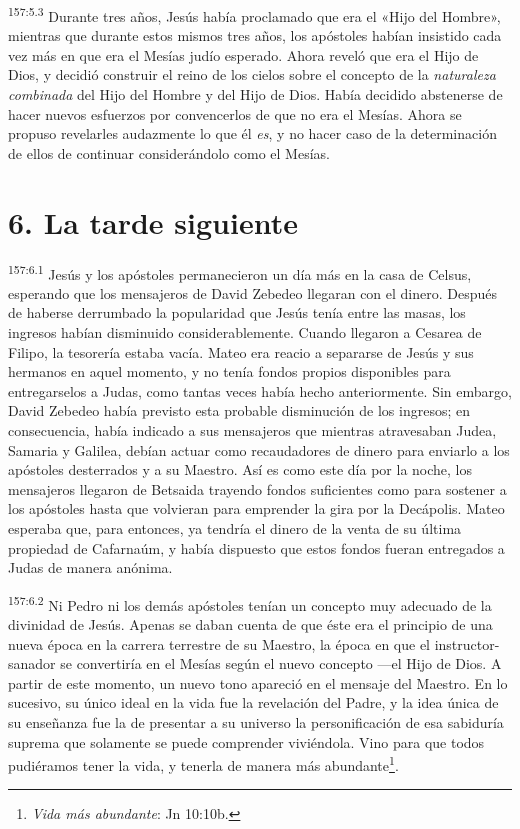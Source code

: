 \par 
\textsuperscript{157:5.3} Durante tres años, Jesús había proclamado que era el «Hijo del Hombre», mientras que durante estos mismos tres años, los apóstoles habían insistido cada vez más en que era el Mesías judío esperado. Ahora reveló que era el Hijo de Dios, y decidió construir el reino de los cielos sobre el concepto de la \textit{naturaleza combinada} del Hijo del Hombre y del Hijo de Dios. Había decidido abstenerse de hacer nuevos esfuerzos por convencerlos de que no era el Mesías. Ahora se propuso revelarles audazmente lo que él \textit{es}, y no hacer caso de la determinación de ellos de continuar considerándolo como el Mesías.

\section*{6. La tarde siguiente}
\par 
\textsuperscript{157:6.1} Jesús y los apóstoles permanecieron un día más en la casa de Celsus, esperando que los mensajeros de David Zebedeo llegaran con el dinero. Después de haberse derrumbado la popularidad que Jesús tenía entre las masas, los ingresos habían disminuido considerablemente. Cuando llegaron a Cesarea de Filipo, la tesorería estaba vacía. Mateo era reacio a separarse de Jesús y sus hermanos en aquel momento, y no tenía fondos propios disponibles para entregarselos a Judas, como tantas veces había hecho anteriormente. Sin embargo, David Zebedeo había previsto esta probable disminución de los ingresos; en consecuencia, había indicado a sus mensajeros que mientras atravesaban Judea, Samaria y Galilea, debían actuar como recaudadores de dinero para enviarlo a los apóstoles desterrados y a su Maestro. Así es como este día por la noche, los mensajeros llegaron de Betsaida trayendo fondos suficientes como para sostener a los apóstoles hasta que volvieran para emprender la gira por la Decápolis. Mateo esperaba que, para entonces, ya tendría el dinero de la venta de su última propiedad de Cafarnaúm, y había dispuesto que estos fondos fueran entregados a Judas de manera anónima.

\par 
\textsuperscript{157:6.2} Ni Pedro ni los demás apóstoles tenían un concepto muy adecuado de la divinidad de Jesús. Apenas se daban cuenta de que éste era el principio de una nueva época en la carrera terrestre de su Maestro, la época en que el instructor-sanador se convertiría en el Mesías según el nuevo concepto ---el Hijo de Dios. A partir de este momento, un nuevo tono apareció en el mensaje del Maestro. En lo sucesivo, su único ideal en la vida fue la revelación del Padre, y la idea única de su enseñanza fue la de presentar a su universo la personificación de esa sabiduría suprema que solamente se puede comprender viviéndola. Vino para que todos pudiéramos tener la vida, y tenerla de manera más abundante\footnote{\textit{Vida más abundante}: Jn 10:10b.}.

